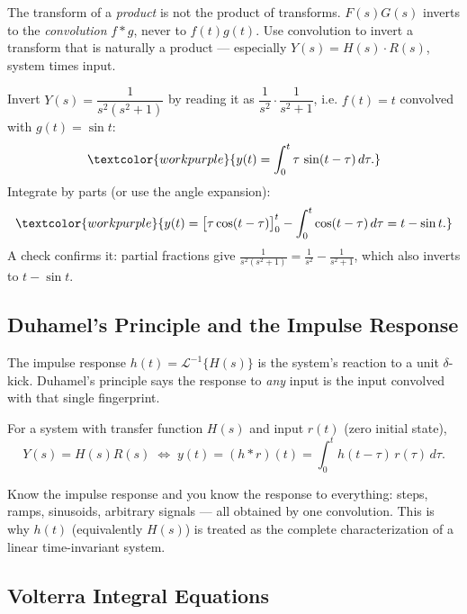 \begin{warningbox}
The transform of a \emph{product} is not the product of transforms. $F(s)G(s)$
inverts to the \emph{convolution} $f*g$, never to $f(t)g(t)$. Use convolution to
invert a transform that is naturally a product --- especially $Y(s)=H(s)\cdot R(s)$,
system times input.
\end{warningbox}

\begin{examplebox}
Invert $Y(s) = \dfrac{1}{s^2(s^2+1)}$ by reading it as
$\dfrac{1}{s^2}\cdot\dfrac{1}{s^2+1}$, i.e. $f(t)=t$ convolved with $g(t)=\sin t$:
\[ \textcolor{workpurple}{y(t) = \int_0^t \tau\,\sin(t-\tau)\,d\tau.} \]
Integrate by parts (or use the angle expansion):
\[ \textcolor{workpurple}{y(t) = \big[\tau\cos(t-\tau)\big]_0^t
   - \int_0^t \cos(t-\tau)\,d\tau = t - \sin t.} \]
A check confirms it: partial fractions give
$\frac{1}{s^2(s^2+1)} = \frac{1}{s^2} - \frac{1}{s^2+1}$, which also inverts to
$t - \sin t$.
\end{examplebox}

\subsection{Duhamel's Principle and the Impulse Response}

The impulse response $h(t) = \mathcal{L}^{-1}\{H(s)\}$ is the system's reaction to a
unit $\delta$-kick. Duhamel's principle says the response to \emph{any} input is the
input convolved with that single fingerprint.

\begin{formulabox}
For a system with transfer function $H(s)$ and input $r(t)$ (zero initial state),
\[ Y(s) = H(s)R(s) \;\Longleftrightarrow\; y(t) = (h * r)(t)
   = \int_0^t h(t-\tau)\,r(\tau)\,d\tau. \]
\end{formulabox}

\begin{conceptbox}
Know the \textcolor{accentorange}{impulse response} and you know the response to
everything: steps, ramps, sinusoids, arbitrary signals --- all obtained by one
convolution. This is why $h(t)$ (equivalently $H(s)$) is treated as the complete
characterization of a linear time-invariant system.
\end{conceptbox}

\subsection{Volterra Integral Equations}

